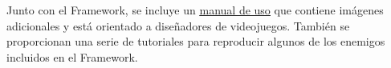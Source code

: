 Junto con el Framework, se incluye un \href{https://github.com/CristinaMora/EnemyBehaviourFramework-2D/tree/c1faf3195c68eb55e0c9239c02ca077aac270f7c}{\underline{manual de uso}} que contiene imágenes adicionales y está orientado a diseñadores de videojuegos. También se proporcionan una serie de tutoriales para reproducir algunos de los enemigos incluidos en el Framework.

